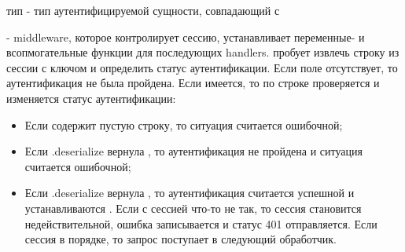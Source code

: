 \label{page-FPauth-core-module-FPauth+u+core-module-Auth+u+sign-module-type-SESSIONMANAGER}\begin{ocamlindent}\label{page-FPauth-core-module-FPauth+u+core-module-Auth+u+sign-module-type-SESSIONMANAGER-type-entity}\begin{ocamlindent}тип  - тип аутентифицируемой сущности, совпадающий с \hyperref[page-FPauth-core-module-FPauth+u+core-module-Auth+u+sign-module-type-MODEL-type-t]{}\end{ocamlindent}%
\medbreak
\label{page-FPauth-core-module-FPauth+u+core-module-Auth+u+sign-module-type-SESSIONMANAGER-val-auth+u+setup}\begin{ocamlindent} - middleware, которое контролирует сессию, устанавливает переменные- и всопмогательные функции для последующих handlers. пробует извлечь строку из сессии с ключом  и определить статус аутентификации. Если поле  отсутствует, то аутентификация не была пройдена. Если  имеется, то по строке проверяется и изменяется статус аутентификации:\begin{itemize}\item{Если  содержит пустую строку, то ситуация считается ошибочной;}%
\item{Если .deserialize вернула , то аутентификация не пройдена и ситуация считается ошибочной;}%
\item{Если .deserialize вернула , то аутентификация считается успешной и устанавливаются \hyperref[page-FPauth-core-module-FPauth+u+core-module-Auth+u+sign-module-type-VARIABLES-val-current+u+user]{}. Если с сессией что-то не так, то сессия становится недействительной, ошибка записывается и статус 401 отправляется. Если сессия в порядке, то запрос поступает в следующий обработчик.}\end{itemize}%
\end{ocamlindent}%
\medbreak
\end{ocamlindent}%
